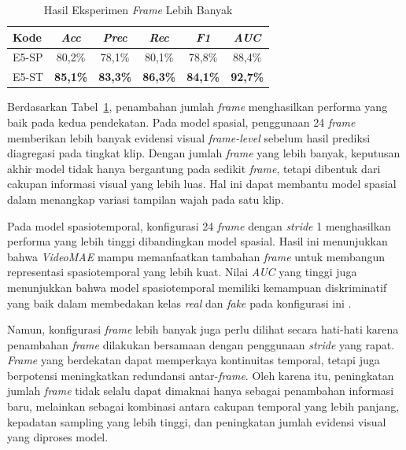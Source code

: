 \begin{table}[htbp]
\centering
\caption{Hasil Eksperimen \textit{Frame} Lebih Banyak}
\label{table:4.eksperimen-utama-frame-banyak}
\begin{tabular}{lccccc}
\toprule
\textbf{Kode} &
\textbf{\textit{Acc}} &
\textbf{\textit{Prec}} &
\textbf{\textit{Rec}} &
\textbf{\textit{F1}} &
\textbf{\textit{AUC}} \\
\midrule
E5-SP & 80,2\% & 78,1\% & 80,1\% & 78,8\% & 88,4\% \\
E5-ST & \textbf{85,1\%} & \textbf{83,3\%} & \textbf{86,3\%} & \textbf{84,1\%} & \textbf{92,7\%} \\
\bottomrule
\end{tabular}
\end{table}

Berdasarkan Tabel~\ref{table:4.eksperimen-utama-frame-banyak}, penambahan jumlah \textit{frame} menghasilkan performa yang baik pada kedua pendekatan. Pada model spasial, penggunaan 24 \textit{frame} memberikan lebih banyak evidensi visual \textit{frame-level} sebelum hasil prediksi diagregasi pada tingkat klip. Dengan jumlah \textit{frame} yang lebih banyak, keputusan akhir model tidak hanya bergantung pada sedikit \textit{frame}, tetapi dibentuk dari cakupan informasi visual yang lebih luas. Hal ini dapat membantu model spasial dalam menangkap variasi tampilan wajah pada satu klip.

Pada model spasiotemporal, konfigurasi 24 \textit{frame} dengan \textit{stride} 1 menghasilkan performa yang lebih tinggi dibandingkan model spasial. Hasil ini menunjukkan bahwa \textit{VideoMAE} mampu memanfaatkan tambahan \textit{frame} untuk membangun representasi spasiotemporal yang lebih kuat. Nilai \textit{AUC} yang tinggi juga menunjukkan bahwa model spasiotemporal memiliki kemampuan diskriminatif yang baik dalam membedakan kelas \textit{real} dan \textit{fake} pada konfigurasi ini \cite{Gu2021,KINGRA2024301817,tong2022videomaemaskedautoencodersdataefficient}.

Namun, konfigurasi \textit{frame} lebih banyak juga perlu dilihat secara hati-hati karena penambahan \textit{frame} dilakukan bersamaan dengan penggunaan \textit{stride} yang rapat. \textit{Frame} yang berdekatan dapat memperkaya kontinuitas temporal, tetapi juga berpotensi meningkatkan redundansi antar-\textit{frame}. Oleh karena itu, peningkatan jumlah \textit{frame} tidak selalu dapat dimaknai hanya sebagai penambahan informasi baru, melainkan sebagai kombinasi antara cakupan temporal yang lebih panjang, kepadatan sampling yang lebih tinggi, dan peningkatan jumlah evidensi visual yang diproses model.

